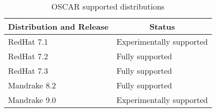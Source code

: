 %
%
%

\begin{table}[htbp]
  \begin{center}
    \begin{tabular}{|l|p{3in}|}
      \hline
      \multicolumn{1}{|c|}{Distribution and Release} &
      \multicolumn{1}{|c|}{Status} \\
      \hline
      \hline
      RedHat 7.1 & Experimentally supported \\
%
      RedHat 7.2 & Fully supported \\
%
      RedHat 7.3 & Fully supported \\
%
\hline
%
      Mandrake 8.2 & Fully supported \\
%
      Mandrake 9.0 & Experimentally supported \\
      \hline
    \end{tabular}
    \caption{OSCAR supported distributions}
    \label{tab:oscar-distro-support}
  \end{center}
\end{table}
